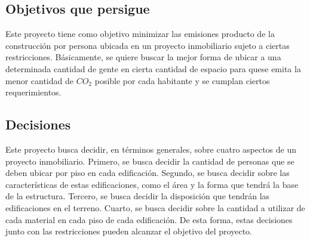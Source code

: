 \documentclass[letterpaper]{article}
\begin{document}
\subsection{Objetivos que persigue}
Este proyecto tiene como objetivo minimizar las emisiones producto de la construcción por persona ubicada en un proyecto inmobiliario sujeto a ciertas restricciones.
Básicamente, se quiere buscar la mejor forma de ubicar a una determinada cantidad de gente en cierta cantidad de espacio para quese emita la menor cantidad de $CO_{2}$ posible
por cada habitante y se cumplan ciertos requerimientos.

\subsection{Decisiones}
Este proyecto busca decidir, en términos generales, sobre cuatro aspectos de un proyecto inmobiliario. Primero, se busca decidir la cantidad de personas que se deben
ubicar por piso en cada edificación. Segundo, se busca decidir sobre las características de estas edificaciones, como el área y la forma que tendrá la base de la estructura. Tercero,
se busca decidir la disposición que tendrán las edificaciones en el terreno. Cuarto, se busca decidir sobre la cantidad a utilizar de 
cada material en cada piso de cada edificación. De esta forma, estas decisiones junto con las restricciones pueden alcanzar el objetivo del proyecto.
\end{document}

